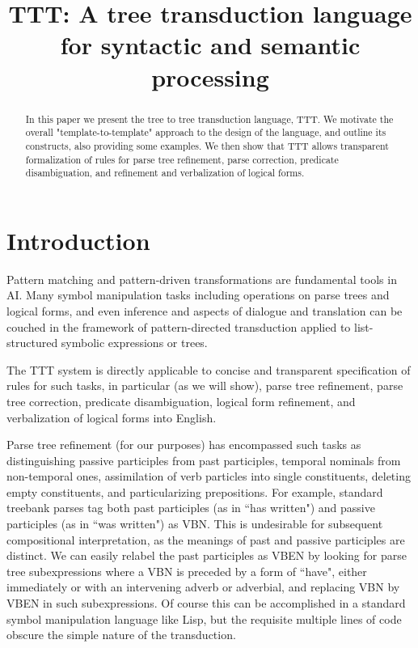 \documentclass[11pt]{article}
\title{TTT: A tree transduction language for syntactic and semantic processing}
\date{}
\begin{document}
\maketitle
\begin{abstract}
In this paper we present the tree to tree transduction language, TTT. We
motivate the overall "template-to-template" approach to the design of 
the language, and outline its constructs, also providing some examples. 
We then show that TTT allows transparent formalization of rules for
parse tree refinement, parse correction, predicate disambiguation, 
and refinement and verbalization of logical forms. 

\end{abstract}

\section{Introduction}
Pattern matching and pattern-driven transformations are fundamental tools in AI.  Many symbol manipulation tasks including operations on parse trees and logical forms, and even inference and aspects of dialogue and translation can be couched in the framework of pattern-directed transduction applied to list-structured symbolic expressions or trees.

The TTT system is directly applicable to concise and transparent specification of rules for such tasks, in particular (as we will show), parse tree refinement, parse tree correction, predicate disambiguation, logical form refinement, and verbalization of logical forms into English. 

Parse tree refinement (for our purposes) has encompassed such tasks as distinguishing passive participles from past participles, temporal nominals from non-temporal ones, assimilation of verb particles into single constituents, deleting empty constituents, and particularizing prepositions. For example, standard treebank parses tag both past participles (as in ``has written") and passive participles (as in ``was written") as VBN. This is undesirable for subsequent compositional interpretation, as the meanings of past and passive participles are distinct. We can easily relabel the past participles as VBEN by looking for parse tree subexpressions where a VBN is preceded by a form of ``have", either immediately or with an intervening adverb or adverbial, and replacing VBN by VBEN in such subexpressions. Of course this can be accomplished in a standard symbol manipulation language like Lisp, but the requisite multiple lines of code obscure the simple nature of the transduction.
\end{document}
